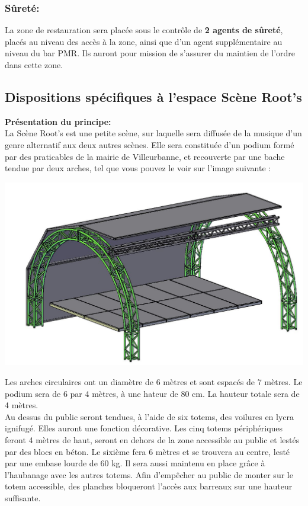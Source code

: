 \documentclass[hidelinks, paper=a4, fontsize=13pt]{report}
\begin{document}
\subsubsection{Sûreté:}

La zone de restauration sera placée sous le contrôle de \textbf{2 agents de sûreté}, placés au niveau des accès à la zone, ainsi que d'un agent supplémentaire au niveau du bar PMR. Ils auront pour mission de s'assurer du maintien de l'ordre dans cette zone.

\subsection{Dispositions spécifiques à l'espace Scène Root's}
\label{Scene_roots}
\textbf{Présentation du principe:}\\

La Scène Root's est une petite scène, sur laquelle sera diffusée de la musique d'un genre alternatif aux deux autres scènes. Elle sera constituée d'un podium formé par des praticables de la mairie de Villeurbanne, et recouverte par une bache tendue par deux arches, tel que vous pouvez le voir sur l'image suivante :

\begin{center}
	\includegraphics[width=.8\textwidth,keepaspectratio]{Annexes/Images/SceneRoots}
\end{center}

Les arches circulaires ont un diamètre de 6 mètres et sont espacés de 7 mètres. Le podium sera de 6 par 4 mètres, à une hateur de 80 cm. La hauteur totale sera de 4 mètres.\\

Au dessus du public seront tendues, à l'aide de six totems, des voilures en lycra ignifugé. Elles auront une fonction décorative. Les cinq totems périphériques feront 4 mètres de haut, seront en dehors de la zone accessible au public et lestés par des blocs en béton. Le sixième fera 6 mètres et se trouvera au centre, lesté par une embase lourde de 60 kg. Il sera aussi maintenu en place grâce à l'haubanage avec les autres totems. Afin d'empêcher au public de monter sur le totem accessible, des planches bloqueront l'accès aux barreaux sur une hauteur suffisante. 
\end{document}
